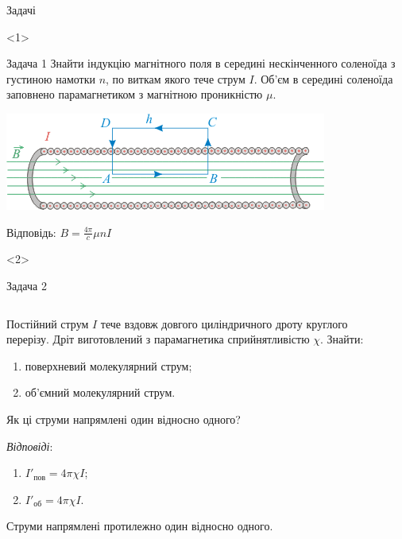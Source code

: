 \documentclass[onlytextwidth]{beamer}
\begin{document}
\begin{frame}{Задачі}{}
\begin{onlyenv}<1>
\begin{exampleblock}{\scriptsize Задача 1}\justifying\scriptsize
    Знайти індукцію магнітного поля в середині нескінченного  соленоїда з густиною намотки $n$, по виткам якого тече струм $I$. Об'єм в середині
    соленоїда заповнено парамагнетиком з магнітною проникністю $\mu$.
\begin{center}
\includegraphics[width=0.5\linewidth]{solenoidField}
\end{center}
Відповідь: $B = \frac{4\pi}{c} \mu n I$
\end{exampleblock}
\end{onlyenv}
\begin{onlyenv}<2>
	\begin{exampleblock}{\scriptsize Задача 2}
		\begin{columns}
			\begin{column}{0.75\linewidth}\justifying\scriptsize
				Постійний струм $I$ тече вздовж довгого циліндричного дроту круглого перерізу. Дріт виготовлений з парамагнетика сприйнятливістю $\chi$.
				Знайти:
				\begin{enumerate}
					\item поверхневий молекулярний струм;
					\item об'ємний молекулярний струм.
				\end{enumerate}
				Як ці струми напрямлені один відносно одного?
				\bigskip

				\textit{Відповіді}:

				\begin{enumerate}
					\item $I'_\text{пов} = 4\pi\chi I$;
					\item $I'_\text{об} = 4\pi\chi I$.
				\end{enumerate}
				Струми напрямлені протилежно один відносно одного.

			\end{column}
			\begin{column}{0.25\linewidth}\centering
				
			\end{column}
		\end{columns}
	\end{exampleblock}
\end{onlyenv}
\end{frame}
\end{document}
